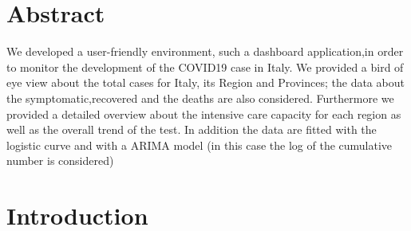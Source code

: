 \documentclass[
12pt, %
a4paper, %
oneside, %
headinclude,footinclude, %
BCOR5mm, %
]{scrartcl}
\begin{document}
\section*{Abstract} %
We developed a user-friendly environment, such a dashboard application,in order to monitor the development of the COVID19 case in Italy. We provided a bird of eye view about the total cases for Italy, its Region and Provinces; the data about the symptomatic,recovered and the deaths are also considered. Furthermore we provided a detailed overview about the intensive care capacity for each region as well as the overall trend of the test. In addition the data are fitted with the logistic curve and with a ARIMA model (in this case the log of the cumulative number is considered)






\newpage %


\section{Introduction} \label{introduction}
\end{document}
